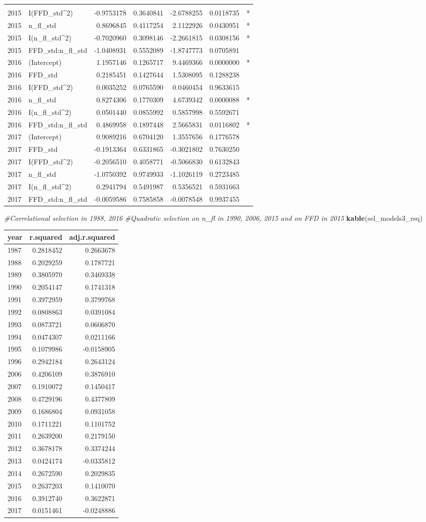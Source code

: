 \documentclass[]{article}
\newenvironment{Shaded}{\begin{snugshade}}{\end{snugshade}}
\newcommand{\KeywordTok}[1]{\textcolor[rgb]{0.13,0.29,0.53}{\textbf{#1}}}
\newcommand{\CommentTok}[1]{\textcolor[rgb]{0.56,0.35,0.01}{\textit{#1}}}
\newcommand{\NormalTok}[1]{#1}
\begin{document}
\begin{longtable}[]{@{}llrrrrl@{}}
&\tabularnewline
2015 & I(FFD\_std\^{}2) & -0.9753178 & 0.3640841 & -2.6788255 &
0.0118735 & *\tabularnewline
2015 & n\_fl\_std & 0.8696845 & 0.4117254 & 2.1122926 & 0.0430951 &
*\tabularnewline
2015 & I(n\_fl\_std\^{}2) & -0.7020960 & 0.3098146 & -2.2661815 &
0.0308156 & *\tabularnewline
2015 & FFD\_std:n\_fl\_std & -1.0408931 & 0.5552089 & -1.8747773 &
0.0705891 &\tabularnewline
2016 & (Intercept) & 1.1957146 & 0.1265717 & 9.4469366 & 0.0000000 &
*\tabularnewline
2016 & FFD\_std & 0.2185451 & 0.1427644 & 1.5308095 & 0.1288238
&\tabularnewline
2016 & I(FFD\_std\^{}2) & 0.0035252 & 0.0765590 & 0.0460454 & 0.9633615
&\tabularnewline
2016 & n\_fl\_std & 0.8274306 & 0.1770309 & 4.6739342 & 0.0000088 &
*\tabularnewline
2016 & I(n\_fl\_std\^{}2) & 0.0501440 & 0.0855992 & 0.5857998 &
0.5592671 &\tabularnewline
2016 & FFD\_std:n\_fl\_std & 0.4869958 & 0.1897448 & 2.5665831 &
0.0116802 & *\tabularnewline
2017 & (Intercept) & 0.9089216 & 0.6704120 & 1.3557656 & 0.1776578
&\tabularnewline
2017 & FFD\_std & -0.1913364 & 0.6331865 & -0.3021802 & 0.7630250
&\tabularnewline
2017 & I(FFD\_std\^{}2) & -0.2056510 & 0.4058771 & -0.5066830 &
0.6132843 &\tabularnewline
2017 & n\_fl\_std & -1.0750392 & 0.9749933 & -1.1026119 & 0.2723485
&\tabularnewline
2017 & I(n\_fl\_std\^{}2) & 0.2941794 & 0.5491987 & 0.5356521 &
0.5931663 &\tabularnewline
2017 & FFD\_std:n\_fl\_std & -0.0059586 & 0.7585858 & -0.0078548 &
0.9937455 &\tabularnewline
\bottomrule
\end{longtable}

\begin{Shaded}
\begin{Highlighting}[]
\CommentTok{#Correlational selection in 1988, 2016}
\CommentTok{#Quadratic selection on n_fl in 1990, 2006, 2015 and on FFD in 2015}
\KeywordTok{kable}\NormalTok{(sel_models3_rsq)}
\end{Highlighting}
\end{Shaded}

\begin{longtable}[]{@{}lrr@{}}
\toprule
year & r.squared & adj.r.squared\tabularnewline
\midrule
\endhead
1987 & 0.2818452 & 0.2663678\tabularnewline
1988 & 0.2029259 & 0.1787721\tabularnewline
1989 & 0.3805970 & 0.3469338\tabularnewline
1990 & 0.2054147 & 0.1741318\tabularnewline
1991 & 0.3972959 & 0.3799768\tabularnewline
1992 & 0.0808863 & 0.0391084\tabularnewline
1993 & 0.0873721 & 0.0606870\tabularnewline
1994 & 0.0474307 & 0.0211166\tabularnewline
1995 & 0.1079986 & -0.0158905\tabularnewline
1996 & 0.2942184 & 0.2643124\tabularnewline
2006 & 0.4206109 & 0.3876910\tabularnewline
2007 & 0.1910072 & 0.1450417\tabularnewline
2008 & 0.4729196 & 0.4377809\tabularnewline
2009 & 0.1686804 & 0.0931058\tabularnewline
2010 & 0.1711221 & 0.1101752\tabularnewline
2011 & 0.2639200 & 0.2179150\tabularnewline
2012 & 0.3678178 & 0.3374244\tabularnewline
2013 & 0.0424174 & -0.0335812\tabularnewline
2014 & 0.2672590 & 0.2029835\tabularnewline
2015 & 0.2637203 & 0.1410070\tabularnewline
2016 & 0.3912740 & 0.3622871\tabularnewline
2017 & 0.0151461 & -0.0248886\tabularnewline
\bottomrule
\end{longtable}
\end{document}
